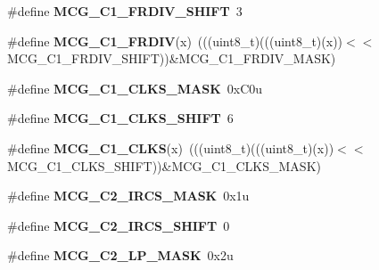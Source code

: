 \begin{DoxyCompactItemize}
\item 
\#define {\bfseries M\+C\+G\+\_\+\+C1\+\_\+\+F\+R\+D\+I\+V\+\_\+\+S\+H\+I\+FT}~3\hypertarget{group__MCG__Register__Masks_gaee124d0ce81f6e815dbbcac62440708b}{}\label{group__MCG__Register__Masks_gaee124d0ce81f6e815dbbcac62440708b}

\item 
\#define {\bfseries M\+C\+G\+\_\+\+C1\+\_\+\+F\+R\+D\+IV}(x)~(((uint8\+\_\+t)(((uint8\+\_\+t)(x))$<$$<$M\+C\+G\+\_\+\+C1\+\_\+\+F\+R\+D\+I\+V\+\_\+\+S\+H\+I\+FT))\&M\+C\+G\+\_\+\+C1\+\_\+\+F\+R\+D\+I\+V\+\_\+\+M\+A\+SK)\hypertarget{group__MCG__Register__Masks_ga39519f6e6a3b433988eca107d0e7d460}{}\label{group__MCG__Register__Masks_ga39519f6e6a3b433988eca107d0e7d460}

\item 
\#define {\bfseries M\+C\+G\+\_\+\+C1\+\_\+\+C\+L\+K\+S\+\_\+\+M\+A\+SK}~0x\+C0u\hypertarget{group__MCG__Register__Masks_gae9a1db29d56ef219e4df3dc9d945b08e}{}\label{group__MCG__Register__Masks_gae9a1db29d56ef219e4df3dc9d945b08e}

\item 
\#define {\bfseries M\+C\+G\+\_\+\+C1\+\_\+\+C\+L\+K\+S\+\_\+\+S\+H\+I\+FT}~6\hypertarget{group__MCG__Register__Masks_ga9ca1068f336097a94984ba4bba0798d6}{}\label{group__MCG__Register__Masks_ga9ca1068f336097a94984ba4bba0798d6}

\item 
\#define {\bfseries M\+C\+G\+\_\+\+C1\+\_\+\+C\+L\+KS}(x)~(((uint8\+\_\+t)(((uint8\+\_\+t)(x))$<$$<$M\+C\+G\+\_\+\+C1\+\_\+\+C\+L\+K\+S\+\_\+\+S\+H\+I\+FT))\&M\+C\+G\+\_\+\+C1\+\_\+\+C\+L\+K\+S\+\_\+\+M\+A\+SK)\hypertarget{group__MCG__Register__Masks_gaffe61ac58c90dfaebbd4748c0dea558c}{}\label{group__MCG__Register__Masks_gaffe61ac58c90dfaebbd4748c0dea558c}

\item 
\#define {\bfseries M\+C\+G\+\_\+\+C2\+\_\+\+I\+R\+C\+S\+\_\+\+M\+A\+SK}~0x1u\hypertarget{group__MCG__Register__Masks_gaef3ef9fc35df3b7d404dd2b7279051cb}{}\label{group__MCG__Register__Masks_gaef3ef9fc35df3b7d404dd2b7279051cb}

\item 
\#define {\bfseries M\+C\+G\+\_\+\+C2\+\_\+\+I\+R\+C\+S\+\_\+\+S\+H\+I\+FT}~0\hypertarget{group__MCG__Register__Masks_ga9a364696151f81b7a671bafd25cf16d1}{}\label{group__MCG__Register__Masks_ga9a364696151f81b7a671bafd25cf16d1}

\item 
\#define {\bfseries M\+C\+G\+\_\+\+C2\+\_\+\+L\+P\+\_\+\+M\+A\+SK}~0x2u\hypertarget{group__MCG__Register__Masks_ga204f588f13f46a9ae20bc7aecfdf4f37}{}\label{group__MCG__Register__Masks_ga204f588f13f46a9ae20bc7aecfdf4f37}


\end{DoxyCompactItemize}
